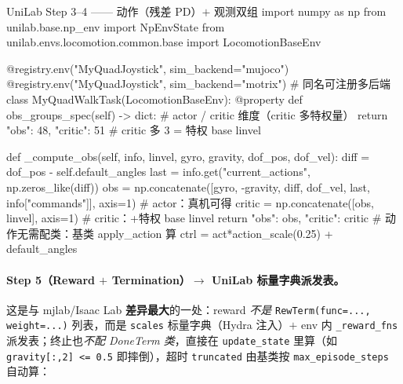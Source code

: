 \begin{codebox}[Python]{UniLab Step 3--4 —— 动作（残差 PD）$+$ 观测双组}
import numpy as np
from unilab.base.np_env import NpEnvState
from unilab.envs.locomotion.common.base import LocomotionBaseEnv

@registry.env("MyQuadJoystick", sim_backend="mujoco")
@registry.env("MyQuadJoystick", sim_backend="motrix")    # 同名可注册多后端
class MyQuadWalkTask(LocomotionBaseEnv):
    @property
    def obs_groups_spec(self) -> dict:                    # actor / critic 维度（critic 多特权量）
        return {"obs": 48, "critic": 51}                 # critic 多 3 = 特权 base linvel

    def _compute_obs(self, info, linvel, gyro, gravity, dof_pos, dof_vel):
        diff = dof_pos - self.default_angles
        last = info.get("current_actions", np.zeros_like(diff))
        obs = np.concatenate([gyro, -gravity, diff, dof_vel, last,
                              info["commands"]], axis=1)              # actor：真机可得
        critic = np.concatenate([obs, linvel], axis=1)               # critic：+特权 base linvel
        return {"obs": obs, "critic": critic}
    # 动作无需配类：基类 apply_action 算 ctrl = act*action_scale(0.25) + default_angles
\end{codebox}

\paragraph{Step 5（Reward $+$ Termination）$\to$ UniLab 标量字典派发表。}这是与 mjlab/Isaac Lab \textbf{差异最大}的一处：reward \emph{不是} \verb|RewTerm(func=..., weight=...)| 列表，而是 \verb|scales| 标量字典（Hydra 注入）$+$ env 内 \verb|_reward_fns| 派发表；终止也\emph{不配 DoneTerm 类}，直接在 \verb|update_state| 里算（如 \verb|gravity[:,2] <= 0.5| 即摔倒），超时 \verb|truncated| 由基类按 \verb|max_episode_steps| 自动算：

